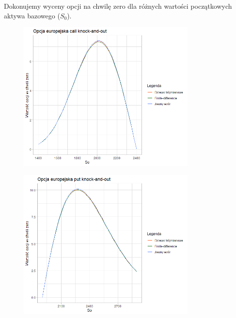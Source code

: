 \documentclass[12pt]{article}
\begin{document}
Dokonujemy wyceny opcji na chwilę zero dla różnych wartości początkowych aktywa bazowego (\(S_{0}\)).

\begin{figure}[H]
    \centering
    \includegraphics[width=0.8\textwidth,height=\textheight,keepaspectratio]{ec_porownanie.png}
    \label{fig:ec}
\end{figure}

\begin{figure}[H]
    \centering
    \includegraphics[width=0.8\textwidth,height=\textheight,keepaspectratio]{ep_porownanie.png}
    \label{fig:ep}
\end{figure}
\end{document}
